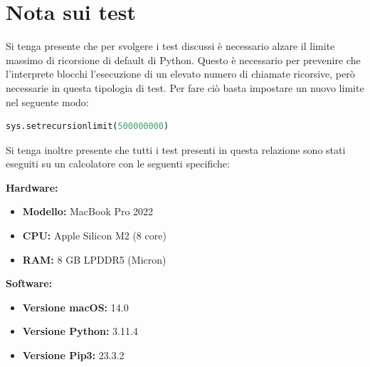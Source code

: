 \documentclass{article}
\begin{document}
\newpage

\section*{Nota sui test}

Si tenga presente che per svolgere i test discussi è necessario alzare il limite massimo di ricorsione di default di Python. Questo è necessario per prevenire che l'interprete blocchi l'esecuzione di un elevato numero di chiamate ricorsive, però necessarie in questa tipologia di test.
Per fare ciò basta impostare un nuovo limite nel seguente modo:
\begin{lstlisting}[language=Python]
sys.setrecursionlimit(500000000)
\end{lstlisting}


\vspace{20pt}


Si tenga inoltre presente che tutti i test presenti in questa relazione sono stati eseguiti su un calcolatore con le seguenti specifiche:

\begin{multicols}{2}
    \textbf{Hardware:}
    \begin{itemize}
        \item \textbf{Modello:} MacBook Pro 2022
        \item \textbf{CPU:} Apple Silicon M2 (8 core)
        \item \textbf{RAM:} 8 GB LPDDR5 (Micron)
    \end{itemize}
    
    \columnbreak
    
    \textbf{Software:}
    \begin{itemize}
        \item \textbf{Versione macOS:} 14.0
        \item \textbf{Versione Python:} 3.11.4
        \item \textbf{Versione Pip3:} 23.3.2
    \end{itemize}
\end{multicols}

\vspace{20pt}

\printbibliography[heading=bibintoc, title={Bibliografia}]  
\end{document}
